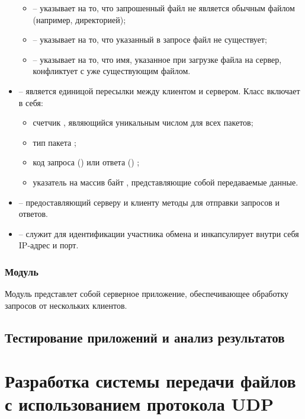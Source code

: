 \begin{itemize}
\begin{itemize}
			\item {} -- указывает на то, что запрошенный файл не является обычным файлом (например, директорией);
			\item {} -- указывает на то, что указанный в запросе файл не существует;
			\item {} -- указывает на то, что имя, указанное при загрузке файла на сервер, конфликтует с уже существующим файлом.
		\end{itemize}
	\item {} -- является единицой пересылки между клиентом и сервером. Класс включает в себя:
		\begin{itemize}
			\item счетчик , являющийся уникальным числом для всех пакетов;
			\item тип пакета ;
			\item код запроса () или ответа () ;
			\item указатель на массив байт , представляющие собой передаваемые данные.
		\end{itemize}
	\item {} -- предоставляющий серверу и клиенту методы для отправки запросов и ответов.
	\item {} -- служит для идентификации участника обмена и инкапсулирует внутри себя IP-адрес и порт. 
\end{itemize}

\subsubsection{Модуль }

Модуль  представлет собой серверное приложение, обеспечивающее обработку запросов от нескольких клиентов. 

\subsection{Тестирование приложений и анализ результатов}


\section{Разработка системы передачи файлов с использованием протокола UDP}

